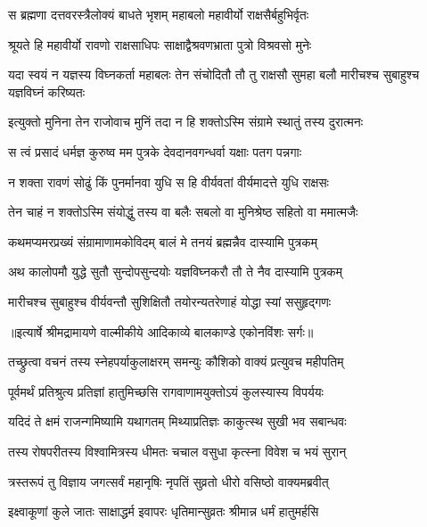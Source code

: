 \twolineshloka
{स ब्रह्मणा दत्तवरस्त्रैलोक्यं बाधते भृशम्}
{महाबलो महावीर्यो राक्षसैर्बहुभिर्वृतः} %

\twolineshloka
{श्रूयते हि महावीर्यो रावणो राक्षसाधिपः}
{साक्षाद्वैश्रवणभ्राता पुत्रो विश्रवसो मुनेः} %

\threelineshloka
{यदा स्वयं न यज्ञस्य विघ्नकर्ता महाबलः}
{तेन संचोदितौ तौ तु राक्षसौ सुमहा बलौ}
{मारीचश्च सुबाहुश्च यज्ञविघ्नं करिष्यतः} %

\twolineshloka
{इत्युक्तो मुनिना तेन राजोवाच मुनिं तदा}
{न हि शक्तोऽस्मि संग्रामे स्थातुं तस्य दुरात्मनः} %

\twolineshloka
{स त्वं प्रसादं धर्मज्ञ कुरुष्व मम पुत्रके}
{देवदानवगन्धर्वा यक्षाः पतग पन्नगाः} %

\twolineshloka
{न शक्ता रावणं सोढुं किं पुनर्मानवा युधि}
{स हि वीर्यवतां वीर्यमादत्ते युधि राक्षसः} %

\twolineshloka
{तेन चाहं न शक्तोऽस्मि संयोद्धुं तस्य वा बलैः}
{सबलो वा मुनिश्रेष्ठ सहितो वा ममात्मजैः} %

\twolineshloka
{कथमप्यमरप्रख्यं संग्रामाणामकोविदम्}
{बालं मे तनयं ब्रह्मन्नैव दास्यामि पुत्रकम्} %

\twolineshloka
{अथ कालोपमौ युद्धे सुतौ सुन्दोपसुन्दयोः}
{यज्ञविघ्नकरौ तौ ते नैव दास्यामि पुत्रकम्} %

\twolineshloka
{मारीचश्च सुबाहुश्च वीर्यवन्तौ सुशिक्षितौ}
{तयोरन्यतरेणाहं योद्धा स्यां ससुहृद्गणः} %


{॥इत्यार्षे श्रीमद्रामायणे वाल्मीकीये आदिकाव्ये बालकाण्डे एकोनविंशः सर्गः॥}


\twolineshloka
{तच्छ्रुत्वा वचनं तस्य स्नेहपर्याकुलाक्षरम्}
{समन्युः कौशिको वाक्यं प्रत्युवच महीपतिम्} %

\twolineshloka
{पूर्वमर्थं प्रतिश्रुत्य प्रतिज्ञां हातुमिच्छसि}
{रागवाणामयुक्तोऽयं कुलस्यास्य विपर्ययः} %

\twolineshloka
{यदिदं ते क्षमं राजन्गमिष्यामि यथागतम्}
{मिथ्याप्रतिज्ञः काकुत्स्थ सुखी भव सबान्धवः} %

\twolineshloka
{तस्य रोषपरीतस्य विश्वामित्रस्य धीमतः}
{चचाल वसुधा कृत्स्ना विवेश च भयं सुरान्} %

\twolineshloka
{त्रस्तरूपं तु विज्ञाय जगत्सर्वं महानृषिः}
{नृपतिं सुव्रतो धीरो वसिष्ठो वाक्यमब्रवीत्} %

\twolineshloka
{इक्ष्वाकूणां कुले जातः साक्षाद्धर्म इवापरः}
{धृतिमान्सुव्रतः श्रीमान्न धर्मं हातुमर्हसि} %

